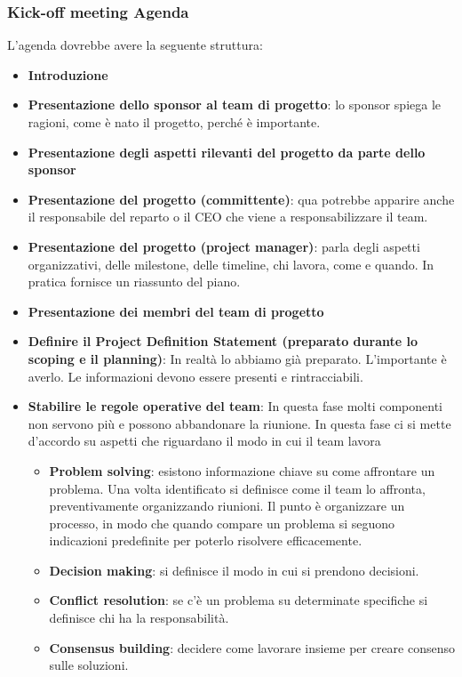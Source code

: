 \subsubsection{Kick-off meeting Agenda}
L’agenda dovrebbe avere la seguente struttura:
\begin{itemize}
	\item \textbf{Introduzione}
	\item \textbf{Presentazione dello sponsor al team di progetto}: lo sponsor spiega le ragioni, come è nato il progetto, perché è importante.
	\item \textbf{Presentazione degli aspetti rilevanti del progetto da parte dello sponsor}
	\item \textbf{Presentazione del progetto (committente)}: qua potrebbe apparire anche il responsabile del reparto o il CEO che viene a responsabilizzare il team.
	\item \textbf{Presentazione del progetto (project manager)}: parla degli aspetti organizzativi, delle milestone, delle timeline, chi lavora, come e quando. In pratica fornisce un riassunto del piano.
	\item \textbf{Presentazione dei membri del team di progetto}
	\item \textbf{Definire il Project Definition Statement (preparato durante lo scoping e il planning)}: In realtà lo abbiamo già preparato. L'importante è averlo. Le informazioni devono essere presenti e rintracciabili.
	\item \textbf{Stabilire le regole operative del team}: In questa fase molti componenti non servono più e possono abbandonare la riunione. In questa fase ci si mette d'accordo su aspetti che riguardano il modo in cui il team lavora
	\begin{itemize}
		\item \textbf{Problem solving}: esistono informazione chiave su come affrontare un problema. Una volta identificato si definisce come il team lo affronta, preventivamente organizzando riunioni. Il punto è organizzare un processo, in modo che quando compare un problema si seguono indicazioni predefinite per poterlo risolvere efficacemente.
		\item \textbf{Decision making}: si definisce il modo in cui si prendono decisioni.
		\item \textbf{Conflict resolution}: se c'è un problema su determinate specifiche si definisce chi ha la responsabilità.
		\item \textbf{Consensus building}: decidere come lavorare insieme per creare consenso sulle soluzioni.

\end{itemize}
\end{itemize}
